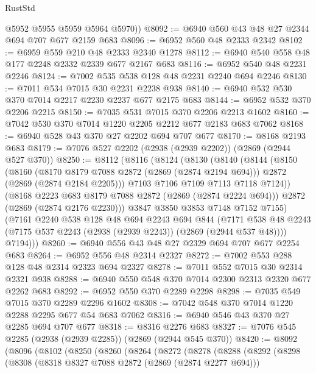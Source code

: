 \begin{lexlean}{RustStd}
\begin{coremodule}
        @5952
        @5955
        @5959
        @5964
        @5970))
@8092 := @6940 @560 @43 @48 @27 @2344 @694 @707 @677 @2159 @683
@8096 := @6952 @560 @48 @2333 @2342
@8102 := @6959 @559 @210 @48 @2333 @2340 @1278
@8112 := @6940 @540 @558 @48 @177 @2248 @2332 @2339 @677 @2167 @683
@8116 := @6952 @540 @48 @2231 @2246
@8124 := @7002 @535 @538 @128 @48 @2231 @2240 @694 @2246
@8130 := @7011 @534 @7015 @30 @2231 @2238 @938
@8140 := @6940 @532 @530 @370 @7014 @2217 @2230 @2237 @677 @2175 @683
@8144 := @6952 @532 @370 @2206 @2215
@8150 := @7035 @531 @7015 @370 @2206 @2213 @1602
@8160 := @7042 @530 @370 @7014 @1220 @2205 @2212 @677 @2183 @683 @7062
@8168 := @6940 @528 @43 @370 @27 @2202 @694 @707 @677
@8170 := @8168 @2193 @683
@8179 := @7076 @527 @2202 (@2938 (@2939 @2202)) (@2869 (@2944 @527 @370))
@8250 := @8112
    (@8116
      (@8124
        (@8130
          (@8140
            (@8144
              (@8150
                (@8160
                  (@8170 @8179 @7088 @2872 (@2869 (@2874 @2194 @694)))
                  @2872
                  (@2869 (@2874 @2184 @2205)))
                @7103
                @7106
                @7109
                @7113
                @7118
                @7124))
            (@8168 @2223 @683 @8179 @7088 @2872 (@2869 (@2874 @2224 @694)))
            @2872
            (@2869 (@2874 @2176 @2230)))
          @3847
          @3850
          @3853
          @7148
          @7152
          @7155)
        (@7161
          @2240
          @538
          @128
          @48
          @694
          @2243
          @694
          @844
          (@7171 @538 @48 @2243 (@7175 @537 @2243 (@2938 (@2939 @2243)) (@2869 (@2944 @537 @48))))
          @7194)))
@8260 := @6940 @556 @43 @48 @27 @2329 @694 @707 @677 @2254 @683
@8264 := @6952 @556 @48 @2314 @2327
@8272 := @7002 @553 @288 @128 @48 @2314 @2323 @694 @2327
@8278 := @7011 @552 @7015 @30 @2314 @2321 @938
@8288 := @6940 @550 @548 @370 @7014 @2300 @2313 @2320 @677 @2262 @683
@8292 := @6952 @550 @370 @2289 @2298
@8298 := @7035 @549 @7015 @370 @2289 @2296 @1602
@8308 := @7042 @548 @370 @7014 @1220 @2288 @2295 @677 @54 @683 @7062
@8316 := @6940 @546 @43 @370 @27 @2285 @694 @707 @677
@8318 := @8316 @2276 @683
@8327 := @7076 @545 @2285 (@2938 (@2939 @2285)) (@2869 (@2944 @545 @370))
@8420 := @8092
    (@8096
      (@8102
        (@8250
          (@8260
            (@8264
              (@8272
                (@8278
                  (@8288
                    (@8292
                      (@8298
                        (@8308
                          (@8318 @8327 @7088 @2872 (@2869 (@2874 @2277 @694)))

\end{coremodule}
\end{lexlean}
